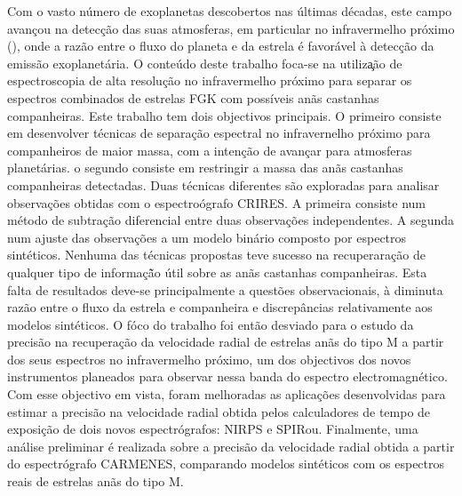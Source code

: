 
\begin{abstract-pt}
    Com o vasto n\'{u}mero de exoplanetas descobertos nas \'{u}ltimas d\'{e}cadas, este campo avan\c{c}ou na detec\c{c}\~{a}o das suas atmosferas, em particular no infravermelho pr\'{o}ximo (\nir{}), onde a razão entre o fluxo do planeta e da estrela \'{e} favor\'{a}vel \`{a} detec\c{c}\~{a}o da emiss\~{a}o exoplanet\'{a}ria.
    O conte\'{u}do deste trabalho foca-se na utiliza\c{}\~{a}o de espectroscopia de alta resolu\c{c}\~{a}o no infravermelho pr\'{o}ximo para separar os espectros combinados de estrelas {FGK} com possíveis an\~{a}s castanhas companheiras.
    Este trabalho tem dois objectivos principais. O primeiro consiste em desenvolver t\'{e}cnicas de separa\c{c}\~{a}o espectral no infravernelho pr\'{o}ximo para companheiros de maior massa, com a inten\c{c}\~{a}o de avan\c{c}ar para atmosferas planet\'{a}rias. o segundo consiste em restringir a massa das an\~{a}s castanhas companheiras detectadas.
    Duas t\'{e}cnicas diferentes s\~{a}o exploradas para analisar observa\c{c}\~{o}es obtidas com o espectro\'{o}grafo {CRIRES}. A primeira consiste num m\'{e}todo de subtra\c{c}\~{a}o diferencial entre duas observa\c{c}\~{o}es independentes. A segunda num ajuste \textchisquared{} das observa\c{c}\~{o}es a um modelo bin\'{a}rio composto por espectros sint\'{e}ticos.
    Nenhuma das t\'{e}cnicas propostas teve sucesso na recuperara\c{c}\~{a}o de qualquer tipo de informa\c{c}\~{ã}o \'{u}til sobre as an\~{a}s castanhas companheiras. Esta falta de resultados deve-se principalmente a quest\~{o}es observacionais, \`{a} diminuta raz\~{a}o entre o fluxo da estrela e companheira e discrep\^{a}ncias relativamente aos modelos sint\'{e}ticos.
    O f\'{o}co do trabalho foi ent\~{a}o desviado para o estudo da precis\~{a}o na recuperação da velocidade radial de estrelas an\~{a}s do tipo M a partir dos seus espectros no infravermelho pr\'{o}ximo, um dos objectivos dos novos instrumentos planeados para observar nessa banda do espectro electromagn\'{e}tico.
    Com esse objectivo em vista, foram melhoradas as aplica\c{c}\~{o}es desenvolvidas para estimar a precis\~{a}o na velocidade radial obtida pelos calculadores de tempo de exposi\c{c}\~{a}o de dois novos \nir{} espectr\'{o}grafos: {NIRPS} e {SPIRou}.
    Finalmente, uma an\'{a}lise preliminar \'{e} realizada sobre a precis\~{a}o da velocidade radial obtida a partir do espectr\'{o}grafo {CARMENES}, comparando modelos sint\'{e}ticos com os espectros reais de estrelas an\~{a}s do tipo M.


\end{abstract-pt}
